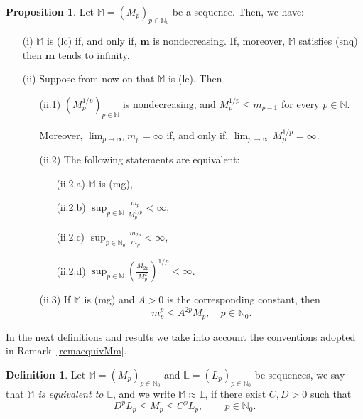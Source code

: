 \documentclass[11pt,a4paper]{article}
\theoremstyle{definition}
\newtheorem{pro}[theo]{Proposition}
\newtheorem{defi}[theo]{Definition}
\newenvironment{prop}{\smallskip\begin{pro}}{\end{pro}\smallskip}
\def\oo{\infty}
\def\N{\mathbb{N}}
\def\M{\mathbb{M}}
\def\L{\mathbb{L}} %
\def\bm{\boldsymbol{m}}
\begin{document}
\begin{prop}\label{propPropiedlcmg}
Let $\M=(M_p)_{p\in\N_0}$ be a sequence. Then, we have:
\begin{itemize}
\item[(i)] $\M$ is (lc) if, and only if, $\bm$ is nondecreasing. If, moreover, $\M$ satisfies (snq) then $\bm$ tends to infinity.
\item[(ii)] Suppose from now on that $\M$ is (lc). Then
\begin{itemize}
\item[(ii.1)]  $(M_p^{1/p})_{p\in\N}$ is nondecreasing, and $M_p^{1/p}\leq m_{p-1}$ for every $p\in\N$.\par %
    Moreover, $\lim_{p\to\infty}m_p=\infty$ if, and only if, $\lim_{p\to\infty}M_p^{1/p}=\infty$.
\item[(ii.2)] The following statements are equivalent:
\begin{itemize}
  \item[(ii.2.a)]  $\M$ is (mg),
  \item[(ii.2.b)] $\sup_{p\in\N} \frac{m_p}{M^{1/p}_p} <\infty$,
  \item[(ii.2.c)]  $\sup_{p\in\N_0} \frac{m_{2p}}{m_{p}}<\infty$,
  \item[(ii.2.d)] $\sup_{p\in\N} \left(\frac{M_{2p}}{M_p^2}\right)^{1/p}<\infty$.
 \end{itemize}
\item[(ii.3)] If  $\M$ is (mg) and $A>0$ is the corresponding constant, then
\begin{equation}\label{eqmg_mppMp}
m_p^p\le A^{2p}M_p,\quad p\in\N_0.
\end{equation}
\end{itemize}
\end{itemize}
\end{prop}


In the next definitions and results we take into account the conventions adopted in Remark~\ref{remaequivMm}.

\begin{defi} Let $\M=(M_p)_{p\in\N_0}$ and $\L=(L_p)_{p\in\N_0}$ be sequences, we say that {\it $\M$ is equivalent to $\L$},
and we write $\M\approx\L$, if there exist $C,D>0$ such that
 $$D^p L_p \leq M_p \leq C^p L_p, \qquad\, p \in \N_0.$$
\end{defi}
\end{document}
